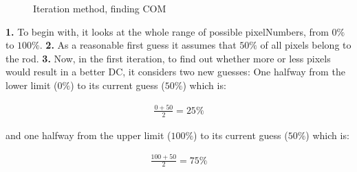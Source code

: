 \begin{figure}[!h]
	\caption{Iteration method, finding COM}
	\label{flo:COM-iter}
\end{figure}

\textbf{1.} To begin with, it looks at the whole range of possible pixelNumbers, from $0\%$ to $100\%$.
\textbf{2.} As a reasonable first guess it assumes that $50\%$ of all pixels belong to the rod.
\textbf{3.} Now, in the first iteration, to find out whether more or less pixels would result in a better DC, it considers two new guesses:
One halfway from the lower limit ($0\%$) to its current guess ($50\%$) which is:

\begin{align}
 \frac{0+50}{2}=25\% 
\end{align}

and one halfway from the upper limit ($100\%$) to its current guess ($50\%$) which is:
 
\begin{align}
 \frac{100+50}{2}=75\%
\end{align}


